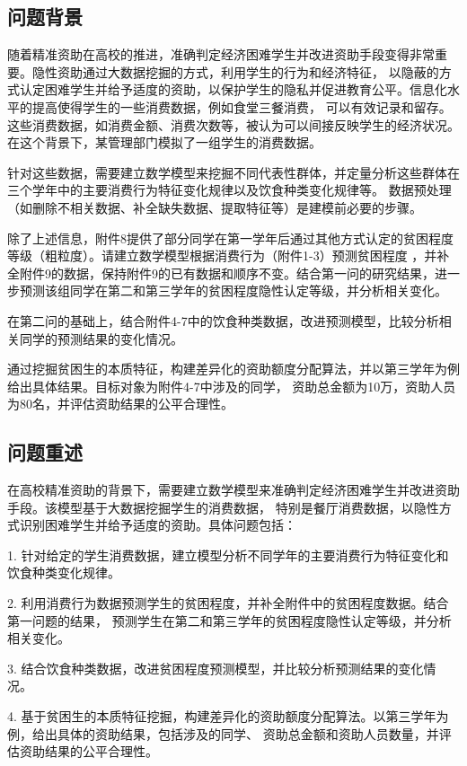 \documentclass{article}
\begin{document}
\subsection{问题背景}

随着精准资助在高校的推进，准确判定经济困难学生并改进资助手段变得非常重要。隐性资助通过大数据挖掘的方式，利用学生的行为和经济特征，
以隐蔽的方式认定困难学生并给予适度的资助，以保护学生的隐私并促进教育公平。信息化水平的提高使得学生的一些消费数据，例如食堂三餐消费，
可以有效记录和留存。这些消费数据，如消费金额、消费次数等，被认为可以间接反映学生的经济状况。在这个背景下，某管理部门模拟了一组学生的消费数据。

针对这些数据，需要建立数学模型来挖掘不同代表性群体，并定量分析这些群体在三个学年中的主要消费行为特征变化规律以及饮食种类变化规律等。
数据预处理（如删除不相关数据、补全缺失数据、提取特征等）是建模前必要的步骤。

除了上述信息，附件8提供了部分同学在第一学年后通过其他方式认定的贫困程度等级（粗粒度）。请建立数学模型根据消费行为（附件1-3）预测贫困程度
，并补全附件9的数据，保持附件9的已有数据和顺序不变。结合第一问的研究结果，进一步预测该组同学在第二和第三学年的贫困程度隐性认定等级，并分析相关变化。

在第二问的基础上，结合附件4-7中的饮食种类数据，改进预测模型，比较分析相关同学的预测结果的变化情况。

通过挖掘贫困生的本质特征，构建差异化的资助额度分配算法，并以第三学年为例给出具体结果。目标对象为附件4-7中涉及的同学，
资助总金额为10万，资助人员为80名，并评估资助结果的公平合理性。

\subsection{问题重述}

在高校精准资助的背景下，需要建立数学模型来准确判定经济困难学生并改进资助手段。该模型基于大数据挖掘学生的消费数据，
特别是餐厅消费数据，以隐性方式识别困难学生并给予适度的资助。具体问题包括：

1. 针对给定的学生消费数据，建立模型分析不同学年的主要消费行为特征变化和饮食种类变化规律。

2. 利用消费行为数据预测学生的贫困程度，并补全附件中的贫困程度数据。结合第一问题的结果，
预测学生在第二和第三学年的贫困程度隐性认定等级，并分析相关变化。

3. 结合饮食种类数据，改进贫困程度预测模型，并比较分析预测结果的变化情况。

4. 基于贫困生的本质特征挖掘，构建差异化的资助额度分配算法。以第三学年为例，给出具体的资助结果，包括涉及的同学、
资助总金额和资助人员数量，并评估资助结果的公平合理性。
\end{document}
